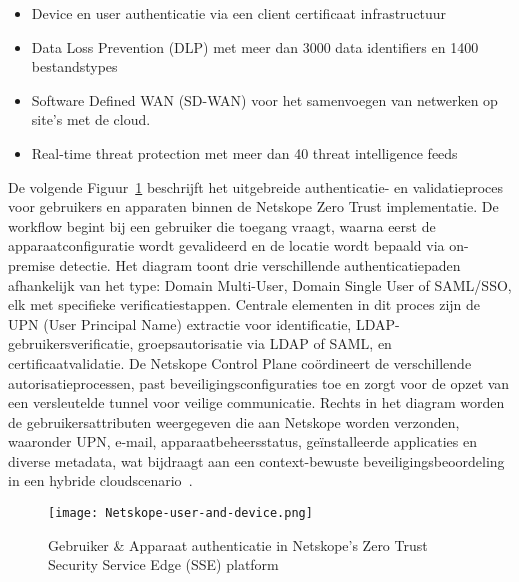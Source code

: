 \begin{itemize}
  \item Device en user authenticatie via een client certificaat infrastructuur
  \item Data Loss Prevention (DLP) met meer dan 3000 data identifiers en 1400 bestandstypes
  \item Software Defined WAN (SD-WAN) voor het samenvoegen van netwerken op site's met de cloud.
  \item Real-time threat protection met meer dan 40 threat intelligence feeds
\end{itemize}

De volgende Figuur~\ref{fig:Netskope-user-and-device} beschrijft het uitgebreide authenticatie- en validatieproces voor gebruikers en apparaten binnen de Netskope Zero Trust implementatie. De workflow begint bij een gebruiker die toegang vraagt, waarna eerst de apparaatconfiguratie wordt gevalideerd en de locatie wordt bepaald via on-premise detectie. Het diagram toont drie verschillende authenticatiepaden afhankelijk van het type: Domain Multi-User, Domain Single User of SAML/SSO, elk met specifieke verificatiestappen. Centrale elementen in dit proces zijn de UPN (User Principal Name) extractie voor identificatie, LDAP-gebruikersverificatie, groepsautorisatie via LDAP of SAML, en certificaatvalidatie. De Netskope Control Plane coördineert de verschillende autorisatieprocessen, past beveiligingsconfiguraties toe en zorgt voor de opzet van een versleutelde tunnel voor veilige communicatie. Rechts in het diagram worden de gebruikersattributen weergegeven die aan Netskope worden verzonden, waaronder UPN, e-mail, apparaatbeheersstatus, geïnstalleerde applicaties en diverse metadata, wat bijdraagt aan een context-bewuste beveiligingsbeoordeling in een hybride cloudscenario~\autocite{Netskope2024}.
\begin{figure}[h!]
  \centering
  \texttt{[image: Netskope-user-and-device.png]}
  \caption[]{Gebruiker \& Apparaat authenticatie in Netskope's Zero Trust Security Service Edge (SSE) platform~\autocite{Netskope2024}}
  \label{fig:Netskope-user-and-device}
\end{figure}

